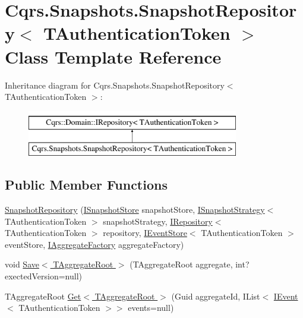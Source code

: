 \hypertarget{classCqrs_1_1Snapshots_1_1SnapshotRepository}{}\section{Cqrs.\+Snapshots.\+Snapshot\+Repository$<$ T\+Authentication\+Token $>$ Class Template Reference}
\label{classCqrs_1_1Snapshots_1_1SnapshotRepository}
Inheritance diagram for Cqrs.\+Snapshots.\+Snapshot\+Repository$<$ T\+Authentication\+Token $>$\+:\begin{figure}[H]
\begin{center}
\leavevmode
\includegraphics[height=2.000000cm]{classCqrs_1_1Snapshots_1_1SnapshotRepository}
\end{center}
\end{figure}
\subsection*{Public Member Functions}
\begin{DoxyCompactItemize}
\item 
\hyperlink{classCqrs_1_1Snapshots_1_1SnapshotRepository_acb079e402392fd79028ddc058ac8344c}{Snapshot\+Repository} (\hyperlink{interfaceCqrs_1_1Snapshots_1_1ISnapshotStore}{I\+Snapshot\+Store} snapshot\+Store, \hyperlink{interfaceCqrs_1_1Snapshots_1_1ISnapshotStrategy}{I\+Snapshot\+Strategy}$<$ T\+Authentication\+Token $>$ snapshot\+Strategy, \hyperlink{interfaceCqrs_1_1Domain_1_1IRepository}{I\+Repository}$<$ T\+Authentication\+Token $>$ repository, \hyperlink{interfaceCqrs_1_1Events_1_1IEventStore}{I\+Event\+Store}$<$ T\+Authentication\+Token $>$ event\+Store, \hyperlink{interfaceCqrs_1_1Domain_1_1Factories_1_1IAggregateFactory}{I\+Aggregate\+Factory} aggregate\+Factory)
\item 
void \hyperlink{classCqrs_1_1Snapshots_1_1SnapshotRepository_a4a7484e7754cae876f0c04e640eb80ff}{Save$<$ T\+Aggregate\+Root $>$} (T\+Aggregate\+Root aggregate, int? exected\+Version=null)
\item 
T\+Aggregate\+Root \hyperlink{classCqrs_1_1Snapshots_1_1SnapshotRepository_acdbea47afc87de1da613a6eff3ceef0f}{Get$<$ T\+Aggregate\+Root $>$} (Guid aggregate\+Id, I\+List$<$ \hyperlink{interfaceCqrs_1_1Events_1_1IEvent}{I\+Event}$<$ T\+Authentication\+Token $>$$>$ events=null)
\end{DoxyCompactItemize}


